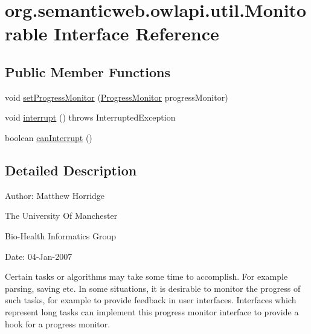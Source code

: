 \hypertarget{interfaceorg_1_1semanticweb_1_1owlapi_1_1util_1_1_monitorable}{\section{org.\-semanticweb.\-owlapi.\-util.\-Monitorable Interface Reference}
\label{interfaceorg_1_1semanticweb_1_1owlapi_1_1util_1_1_monitorable}
}
\subsection*{Public Member Functions}
\begin{DoxyCompactItemize}
\item 
void \hyperlink{interfaceorg_1_1semanticweb_1_1owlapi_1_1util_1_1_monitorable_a878ff3634ea68610ef8028d8dd34584b}{set\-Progress\-Monitor} (\hyperlink{interfaceorg_1_1semanticweb_1_1owlapi_1_1util_1_1_progress_monitor}{Progress\-Monitor} progress\-Monitor)
\item 
void \hyperlink{interfaceorg_1_1semanticweb_1_1owlapi_1_1util_1_1_monitorable_a12bff92a0513f851881c570d168062ed}{interrupt} ()  throws Interrupted\-Exception
\item 
boolean \hyperlink{interfaceorg_1_1semanticweb_1_1owlapi_1_1util_1_1_monitorable_a298c8819dda5f215a95b318fc4fd8330}{can\-Interrupt} ()
\end{DoxyCompactItemize}


\subsection{Detailed Description}
Author\-: Matthew Horridge\par
 The University Of Manchester\par
 Bio-\/\-Health Informatics Group\par
 Date\-: 04-\/\-Jan-\/2007\par
\par


Certain tasks or algorithms may take some time to accomplish. For example parsing, saving etc. In some situations, it is desirable to monitor the progress of such tasks, for example to provide feedback in user interfaces. Interfaces which represent long tasks can implement this progress monitor interface to provide a hook for a progress monitor. 

